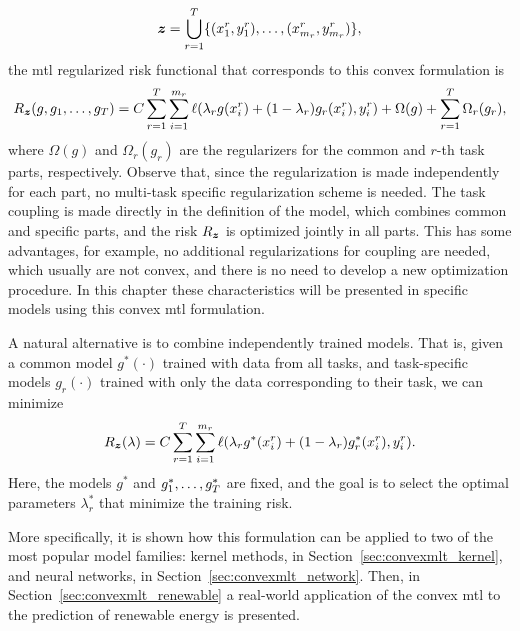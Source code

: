 $$\bm{z} = \bigcup_{r=1}^T \{(x_1^r, y_1^r), \ldots, (x_{m_r}^r, y_{m_r}^r)\},$$
the \acrshort{mtl} regularized risk functional that corresponds to this convex formulation is 
\begin{equation}
    \label{eq:convexmtl_general_regrisk}
    \risk_{\bsample} ({g, g_1, \ldots, g_\ntasks}) = C\sum_{r=1}^{\ntasks} \sum_{i=1}^{\npertask_r} \lossf(\lambda_r g(x_i^r) + (1 - \lambda_r) g_r(x_i^r), y_i^r) + \Omega(g) + \sum_{r=1}^\ntasks \Omega_r(g_r) ,
\end{equation}
where $\Omega(g)$ and $\Omega_r(g_r)$ are the regularizers for the common and $r$-th task parts, respectively. Observe that, since the regularization is made independently for each part, no multi-task specific regularization scheme is needed. The task coupling is made directly in the definition of the model, which combines common and specific parts, and the risk $R_{\bm{z}}$ is optimized jointly in all parts.
This has some advantages, for example, no additional regularizations for coupling are needed, which usually are not convex, and there is no need to develop a new optimization procedure. In this chapter these characteristics will be presented in specific models using this convex \acrshort{mtl} formulation.
%

A natural alternative is to combine independently trained models. That is, given a common model $g^*(\cdot)$ trained with data from all tasks, and task-specific models $g_r(\cdot)$ trained with only the data corresponding to their task, we can minimize 
\begin{equation}
    \label{eq:convexmtl_combination}
    \risk_{\bsample} (\lambda) = C\sum_{r=1}^{\ntasks} \sum_{i=1}^{\npertask_r} \lossf(\lambda_r g^*(x_i^r) + (1 - \lambda_r) g^*_r(x_i^r), y_i^r)  .
\end{equation}
Here, the models $g^*$ and $g^*_1, \ldots, g^*_T$ are fixed, and the goal is to select the optimal parameters $\lambda^*_r$ that minimize the training risk.

%
More specifically, it is shown how this formulation can be applied to two of the most popular model families: kernel methods, in Section~\ref{sec:convexmlt_kernel}, and neural networks, in Section~\ref{sec:convexmlt_network}.
Then, in Section~\ref{sec:convexmlt_renewable} a real-world application of the convex \acrshort{mtl} to the prediction of renewable energy is presented.
%




